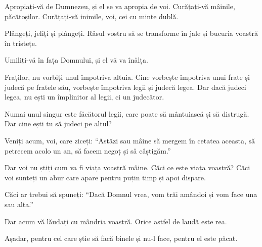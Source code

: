 {Apropiați-vă de Dumnezeu, și el se va apropia de voi. Curățați-vă mâinile, păcătoșilor. Curățați-vă inimile, voi, cei cu minte dublă.

Plângeți, jeliți și plângeți. Râsul vostru să se transforme în jale și bucuria voastră în tristețe.

Umiliți-vă în fața Domnului, și el vă va înălța.


\par }{\PP {}Fraților, nu vorbiți unul împotriva altuia. Cine vorbește împotriva unui frate și judecă pe fratele său, vorbește împotriva legii și judecă legea. Dar dacă judeci legea, nu ești un împlinitor al legii, ci un judecător.

Numai unul singur este făcătorul legii, care poate să mântuiască și să distrugă. Dar cine ești tu să judeci pe altul?


\par }{\PP {}Veniți acum, voi, care ziceți: “Astăzi sau mâine să mergem în cetatea aceasta, să petrecem acolo un an, să facem negoț și să câștigăm.”

Dar voi nu știți cum va fi viața voastră mâine. Căci ce este viața voastră? Căci voi sunteți un abur care apare pentru puțin timp și apoi dispare.

Căci ar trebui să spuneți: “Dacă Domnul vrea, vom trăi amândoi și vom face una sau alta.”

Dar acum vă lăudați cu mândria voastră. Orice astfel de laudă este rea.

Așadar, pentru cel care știe să facă binele și nu-l face, pentru el este păcat.



\par }
